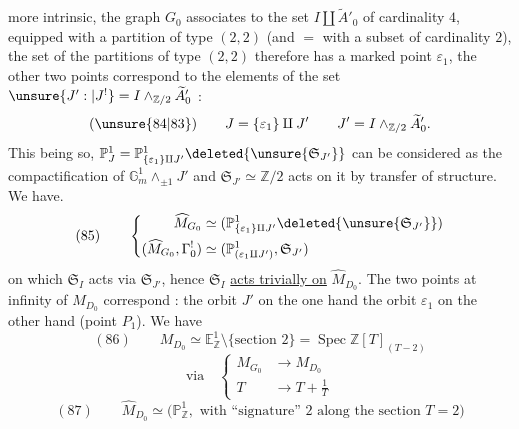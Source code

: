 more intrinsic, the graph $G_0$  associates to the set $I\amalg\widetilde A'_0$ of cardinality $4$, equipped with a partition of type $(2,2)$ (and $=$ with a subset  of cardinality $2$), the set  of the  partitions of type $(2,2)$ therefore has a marked point $\varepsilon_1$, the other two points correspond to the elements of the set $\unsure{J':|J^!}=I\wedge_{\mathbb Z/2}\widetilde A'_0$ :
\[
(\unsure{84|83})\qquad J=\{\varepsilon_1\}\amalg J'\qquad J'=I\wedge_{\mathbb Z/2}\widetilde A'_0.
\]
This being so, $\mathbb P^1_J=\mathbb P^1_{\{\varepsilon_1\}\amalg J'}\deleted{\unsure{\mathfrak S_{J'}}}$ can be considered as the compactification of $\mathbb G_m^{1}\wedge_{\pm1}J'$ and  $\mathfrak S_{J'}\simeq\mathbb Z/2$ acts on it by transfer of structure. We have.
\[
(85)\qquad
\left\{\begin{aligned}
\widehat M_{G_0}&\simeq(\mathbb P^1_{\{\varepsilon_1\}\amalg J'}\deleted{\unsure{\mathfrak S_{J'}}})\\
(\widehat M_{G_0},\Gamma^!_0)&\simeq(\mathbb P^1_{(\varepsilon_1\amalg J')},\mathfrak S_{J'})
\end{aligned}\right.
\]
on which $\mathfrak S_I$ acts via $\mathfrak S_{J'}$, hence $\mathfrak S_I$ \uline{acts trivially on} $\widehat M_{D_0}$. The two points at infinity of $\widehat M_{D_0}$ correspond : the orbit $J'$ on the one hand  the orbit $\varepsilon_1$ on the other hand (point $P_1$). We have
\[
(86)\qquad M_{D_0}\simeq\mathbb E^1_{\mathbb Z}\setminus\{\text{section }2\}=\operatorname{Spec}\mathbb Z[T]_{(T-2)}
\]
\[
\text{via}\quad\left\{\begin{aligned}M_{G_0}&\longrightarrow M_{D_0}\\ T&\longrightarrow T+\frac1T\end{aligned}\right.
\]
\[
(87)\qquad\widehat M_{D_0}\simeq\bigl(\mathbb P^1_{\mathbb Z},\text{ with ``signature'' }2\text{ along the section }T=2\bigr)
\]
